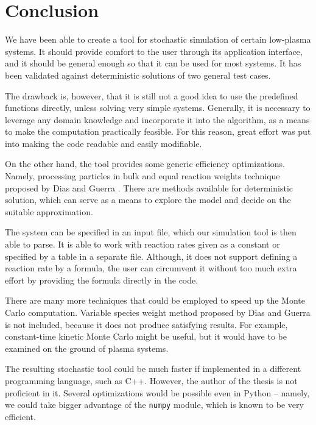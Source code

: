 \chapter*{Conclusion}

We have been able to create a tool for stochastic simulation of certain low-plasma systems. It should provide comfort to the user through its application interface, and it should be general enough so that it can be used for most systems. It has been validated against deterministic solutions of two general test cases.

The drawback is, however, that it is still not a good idea to use the predefined functions directly, unless solving very simple systems. Generally, it is necessary to leverage any domain knowledge and incorporate it into the algorithm, as a means to make the computation practically feasible. For this reason, great effort was put into making the code readable and easily modifiable.

On the other hand, the tool provides some generic efficiency optimizations. Namely, processing particles in bulk and equal reaction weights technique proposed by Dias and Guerra \cite{tiago20}. There are methods available for deterministic solution, which can serve as a means to explore the model and decide on the suitable approximation. 

The system can be specified in an input file, which our simulation tool is then able to parse. It is able to work with reaction rates given as a constant or specified by a table in a separate file. Although, it does not support defining a reaction rate by a formula, the user can circumvent it without too much extra effort by providing the formula directly in the code.

There are many more techniques that could be employed to speed up the Monte Carlo computation. Variable species weight method proposed by Dias and Guerra \cite{tiago20} is not included, because it does not produce satisfying results. For example, constant-time kinetic Monte Carlo \cite{constant-time} might be useful, but it would have to be examined on the ground of plasma systems.

The resulting stochastic tool could be much faster if implemented in a different programming language, such as C++. However, the author of the thesis is not proficient in it. Several optimizations would be possible even in Python -- namely, we could take bigger advantage of the \verb|numpy| module, which is known to be very efficient.